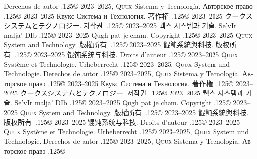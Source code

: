 \documentclass{cookbook}
\begin{document}
{{{Derechos de autor {\lower.125\baselineskip\hbox{\copyright}} %
	2023--2025, \textsc{Quux} Sistema y Tecnología.
\foreignlanguage{russian}{Авторское право} %
	{\lower.125\baselineskip\hbox{\copyright}}
	2023–2025 \foreignlanguage{russian}{Квукс Система и Технология.}
著作権~{\lower.125\baselineskip\hbox{\copyright}}
	2023--2025 クークスシステムとテクノロジー.
저작권~{\lower.125\baselineskip\hbox{\copyright}}
	2023--2025 퀙스 시스템과 기술.
Se'vIr malja' DIb {\lower.125\baselineskip\hbox{\copyright}} %
	2023--2025 Qugh pat je cham.
\texttt{{\gitabbrcommithash}}
Copyright {\lower.125\baselineskip\hbox{\copyright}}
	2023--2025 \textsc{Quux} System and Technology.
版權所有~{\lower.125\baselineskip\hbox{\copyright}}
	2023--2025 餛飩系統與科技.
版权所有~{\lower.125\baselineskip\hbox{\copyright}}
	2023--2025 馄饨系统与科技.
Droits d'auteur {\lower.125\baselineskip\hbox{\copyright}} %
	2023--2025 \textsc{Quux} Système et Technologie.
Urheberrecht {\lower.125\baselineskip\hbox{\copyright}} %
	2023--2025, \textsc{Quux} System und Technologie.
Derechos de autor {\lower.125\baselineskip\hbox{\copyright}} %
	2023--2025, \textsc{Quux} Sistema y Tecnología.
\foreignlanguage{russian}{Авторское право} %
	{\lower.125\baselineskip\hbox{\copyright}}
	2023–2025 \foreignlanguage{russian}{Квукс Система и Технология.}
著作権~{\lower.125\baselineskip\hbox{\copyright}}
	2023--2025 クークスシステムとテクノロジー.
저작권~{\lower.125\baselineskip\hbox{\copyright}}
	2023--2025 퀙스 시스템과 기술.
Se'vIr malja' DIb {\lower.125\baselineskip\hbox{\copyright}} %
	2023--2025 Qugh pat je cham.
\texttt{{\gitabbrcommithash}}
Copyright {\lower.125\baselineskip\hbox{\copyright}}
	2023--2025 \textsc{Quux} System and Technology.
版權所有~{\lower.125\baselineskip\hbox{\copyright}}
	2023--2025 餛飩系統與科技.
版权所有~{\lower.125\baselineskip\hbox{\copyright}}
	2023--2025 馄饨系统与科技.
Droits d'auteur {\lower.125\baselineskip\hbox{\copyright}} %
	2023--2025 \textsc{Quux} Système et Technologie.
Urheberrecht {\lower.125\baselineskip\hbox{\copyright}} %
	2023--2025, \textsc{Quux} System und Technologie.
Derechos de autor {\lower.125\baselineskip\hbox{\copyright}} %
	2023--2025, \textsc{Quux} Sistema y Tecnología.
\foreignlanguage{russian}{Авторское право} %
	{\lower.125\baselineskip\hbox{\copyright}}
}}}
\end{document}

